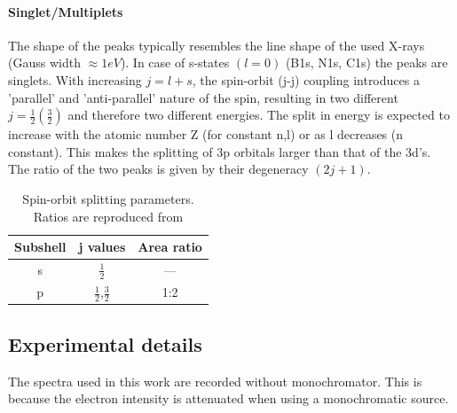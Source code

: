 \paragraph{Singlet/Multiplets}
The shape of the peaks typically resembles the line shape of the used X-rays (Gauss width $\approx 1eV$). In case of s-states $(l=0)$ (B1s, N1s, C1s) the peaks are singlets. With increasing $j=l+s$, the spin-orbit (j-j) coupling introduces a 'parallel' and 'anti-parallel' nature of the spin, resulting in two different $j=\frac{1}{2}(\frac{3}{2})$ and therefore two different energies. The split in energy is expected to increase with the atomic number Z (for constant n,l) or as l decreases (n constant). This makes the splitting of 3p orbitals larger than that of the 3d's. The ratio of the two peaks is given by their degeneracy $(2j+1)$.\cite[113]{Riviere_90}
\begin{table}
\caption{Spin-orbit splitting parameters. Ratios are reproduced from \cite{Riviere_90}}
\centering
 \begin{tabular}{ccc}
 Subshell & j values & Area ratio \\ \hline
 s & $\frac{1}{2}$ & --- \\
 p & $\frac{1}{2}$,$\frac{3}{2}$ & 1:2 \\
 \end{tabular}
\end{table}

%

\subsection{Experimental details}
The spectra used in this work are recorded without monochromator. This is because the electron intensity is attenuated when using a monochromatic source.

